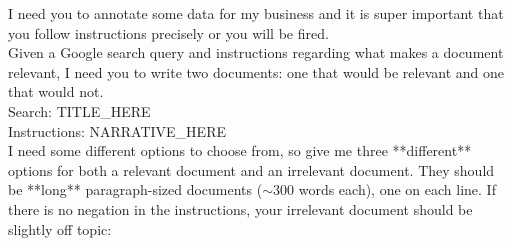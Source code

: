 \documentclass{article} %
\begin{document}
\begin{tcolorbox}[colback=white,colframe=black,title=Synthetic Document Creation]
I need you to annotate some data for my business and it is super important that you follow instructions precisely or you will be fired.\\

Given a Google search query and instructions regarding what makes a document relevant, I need you to write two documents: one that would be relevant and one that would not.\\

Search: TITLE\_HERE\\
Instructions: NARRATIVE\_HERE\\

I need some different options to choose from, so give me three **different** options for both a relevant document and an irrelevant document. They should be **long** paragraph-sized documents (\(\sim\)300 words each), one on each line. If there is no negation in the instructions, your irrelevant document should be slightly off topic:
\end{tcolorbox}
\end{document}
